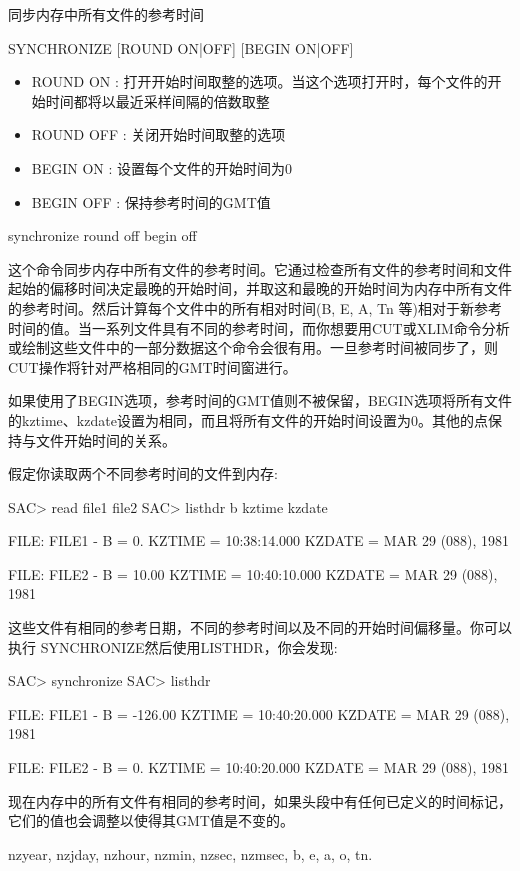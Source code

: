 \label{cmd:synchronize}

同步内存中所有文件的参考时间

\begin{SACSTX}
SYNCHRONIZE [ROUND ON|OFF] [BEGIN ON|OFF]
\end{SACSTX}

\begin{itemize}
\item ROUND ON : 打开开始时间取整的选项。当这个选项打开时，每个文件的开始时间都将以最近采样间隔的倍数取整
\item ROUND OFF : 关闭开始时间取整的选项 
\item BEGIN {ON} : 设置每个文件的开始时间为0 
\item BEGIN OFF : 保持参考时间的GMT值 
\end{itemize}

\begin{SACDFT}
synchronize round off begin off
\end{SACDFT}

这个命令同步内存中所有文件的参考时间。它通过检查所有文件的参考时间和文件起始的偏移时间决定最晚的开始时间，并取这和最晚的开始时间为内存中所有文件的参考时间。然后计算每个文件中的所有相对时间(B, E, A, Tn 等)相对于新参考时间的值。当一系列文件具有不同的参考时间，而你想要用CUT或XLIM命令分析或绘制这些文件中的一部分数据这个命令会很有用。一旦参考时间被同步了，则CUT操作将针对严格相同的GMT时间窗进行。

如果使用了BEGIN选项，参考时间的GMT值则不被保留，BEGIN选项将所有文件的kztime、kzdate设置为相同，而且将所有文件的开始时间设置为0。其他的点保持与文件开始时间的关系。

假定你读取两个不同参考时间的文件到内存:
\begin{SACCode}
SAC> read file1 file2
SAC> listhdr b kztime kzdate

  FILE: FILE1
  -
  B = 0.
  KZTIME = 10:38:14.000
  KZDATE = MAR 29 (088), 1981

  FILE: FILE2
  -
  B = 10.00
  KZTIME = 10:40:10.000
  KZDATE = MAR 29 (088), 1981
\end{SACCode}

这些文件有相同的参考日期，不同的参考时间以及不同的开始时间偏移量。你可以执行	SYNCHRONIZE然后使用LISTHDR，你会发现:
\begin{SACCode}
SAC> synchronize
SAC> listhdr

  FILE: FILE1
  -
  B = -126.00
  KZTIME = 10:40:20.000
  KZDATE = MAR 29 (088), 1981

  FILE: FILE2
  -
  B = 0.
  KZTIME = 10:40:20.000
  KZDATE = MAR 29 (088), 1981
\end{SACCode}
现在内存中的所有文件有相同的参考时间，如果头段中有任何已定义的时间标记，它们的值也会调整以使得其GMT值是不变的。

nzyear, nzjday, nzhour, nzmin, nzsec, nzmsec, b, e, a, o, tn.
